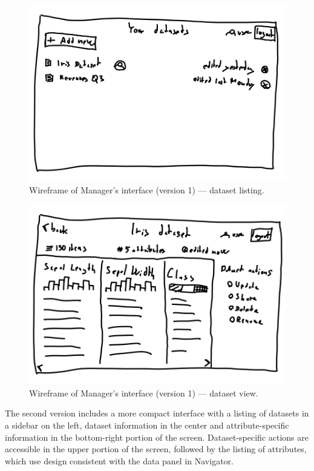 \documentclass[thesis=M,english,hidelinks]{FITthesisXE}[2012/06/26]
\begin{document}
\begin{figure}[ht]
\centering
\includegraphics[scale=0.2]{wireframe_dataset1_1}
\caption{Wireframe of Manager's interface (version 1) --- dataset listing.}
\label{fig:wireframe_dataset1_1}
\end{figure}

\begin{figure}[ht]
\centering
\includegraphics[scale=0.2]{wireframe_dataset1_2}
\caption{Wireframe of Manager's interface (version 1) --- dataset view.}
\label{fig:wireframe_dataset1_2}
\end{figure}

The second version includes a more compact interface with a listing of datasets in a sidebar on the left, dataset information in the center and attribute-specific information in the bottom-right portion of the screen. Dataset-specific actions are accessible in the upper portion of the screen, followed by the listing of attributes, which use design consistent with the data panel in Navigator.
\end{document}
